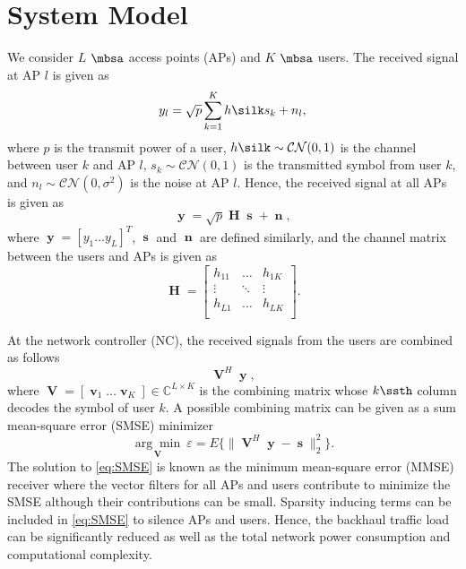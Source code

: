 \documentclass[journal]{IEEEtran}
\begin{document}
\section{System Model} \label{sec:SystemModel}
We consider $L$ $\mbsa$ access points (APs) and $K$ $\mbsa$ users. The received signal at AP $l$ is given as
\begin{equation}\label{eq:ReceivedSignalatAP}
y_l=\sqrt{p}\sum_{k=1}^K h\silk s_k+n_l,
\end{equation}
where $p$ is the transmit power of a user, $h\silk\sim\mathcal{CN}(0,1)$ is the channel between user $k$ and AP $l$, $s_k\sim\mathcal{CN}(0,1)$ is the transmitted symbol from user $k$, and $n_l\sim\mathcal{CN}(0,\sigma^2)$ is the noise at AP $l$. Hence, the received signal at all APs is given as
\begin{equation}\label{eq:ReceivedSignalAll}
\mbfy=\sqrt{p}\mbfH\mbfs+\mbfn,
\end{equation}
where ${\mbfy=\left[y_1 \ldots y_L\right]^T}$, $\mbfs$ and $\mbfn$ are defined similarly, and the channel matrix between the users and APs is given as
\begin{equation}\label{eq:H}
\mbfH=
\begin{bmatrix}
h_{11} & \ldots & h_{1K}\\
\vdots & \ddots & \vdots\\
h_{L1} & \ldots & h_{LK}\\
\end{bmatrix}.
\end{equation}

At the network controller (NC), the received signals from the users are combined as follows
\begin{equation}\label{eq:Combining}
\mbfV^H\mbfy,
\end{equation}
where ${\mbfV=[\mbfv_1 \ldots \mbfv_K]\in\mathbb{C}^{L\times K}}$ is the combining matrix whose $k\ssth$ column decodes the symbol of user $k$. A possible combining matrix can be given as a sum mean-square error (SMSE) minimizer 
\begin{equation}\label{eq:SMSE}
\underset{\mbfV}{\arg\min}~\varepsilon=E\{\|\mbfV^H\mbfy-\mbfs\|_2^2\}.
\end{equation}
The solution to \eqref{eq:SMSE} is known as the minimum mean-square error (MMSE) receiver where the vector filters for all APs and users contribute to minimize the SMSE although their contributions can be small. Sparsity inducing terms can be included in \eqref{eq:SMSE} to silence APs and users. Hence, the backhaul traffic load can be significantly reduced as well as the total network power consumption and computational complexity.
\end{document}
